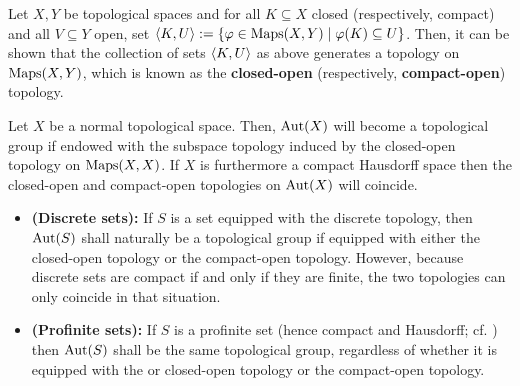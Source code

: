             \begin{definition} \label{def: the_compact_open_topology}
                Let $X, Y$ be topological spaces and for all $K \subseteq X$ closed (respectively, compact) and all $V \subseteq Y$ open, set $\langle K, U\rangle := \{\varphi \in \mathrm{Maps}(X, Y) \mid \varphi(K) \subseteq U\}$. Then, it can be shown that the collection of sets $\langle K, U\rangle$ as above generates a topology on $\mathrm{Maps}(X, Y)$, which is known as the \textbf{closed-open} (respectively, \textbf{compact-open}) topology.
            \end{definition}
            \begin{lemma} \label{lemma: the_compact_open_topology_on_automorphism_groups}
                \cite[Theorem 3.5.2 and Corollary 3.5.3]{topological_groups_and_related_structures} Let $X$ be a normal topological space. Then, $\mathrm{Aut}(X)$ will become a topological group if endowed with the subspace topology induced by the closed-open topology on $\mathrm{Maps}(X, X)$. If $X$ is furthermore a compact Hausdorff space then the closed-open and compact-open topologies on $\mathrm{Aut}(X)$ will coincide.
            \end{lemma}
            \begin{example} \label{example: the_compact_open_topology_on_automorphism_groups_of_sets}
                \noindent
                \begin{itemize}
                    \item \textbf{(Discrete sets):} \cite[\href{https://stacks.math.columbia.edu/tag/0BMC}{Tag 0BMC}]{stacks} If $S$ is a set equipped with the discrete topology, then $\mathrm{Aut}(S)$ shall naturally be a topological group if equipped with either the closed-open topology or the compact-open topology. However, because discrete sets are compact if and only if they are finite, the two topologies can only coincide in that situation.
                    \item \textbf{(Profinite sets):} If $S$ is a profinite set (hence compact and Hausdorff; cf. \cite[\href{https://stacks.math.columbia.edu/tag/08ZY}{Tag 08ZY}]{stacks}) then $\mathrm{Aut}(S)$ shall be the same topological group, regardless of whether it is equipped with the or closed-open topology or the compact-open topology. 
                \end{itemize}
            \end{example}

